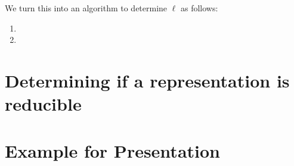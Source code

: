 \documentclass[11pt]{amsart}
\theoremstyle{definition}
\theoremstyle{remark}
\begin{document}
We turn this into an algorithm to determine $\ell$ as follows:
\begin{enumerate}
\item
\item
\end{enumerate}


\section{Determining if a representation is reducible}\label{test_ell}


\section{Example for Presentation}
\end{document}
